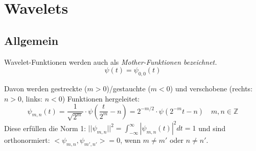 \section{Wavelets}
\subsection{Allgemein }
  Wavelet-Funktionen werden auch als \em Mother-Funktionen \em bezeichnet.
  \[
    \psi(t) = \psi_{0,0}(t)
  \]
 
  Davon werden gestreckte ($m>0$)/gestauchte ($m<0$) und verschobene (rechts: $n > 0$, links: $n < 0$) Funktionen hergeleitet:
  \[  
    \psi_{m,n}(t)=\frac{1}{\sqrt{2^m}} \cdot \psi\left(\frac{t}{2^m} - n\right) = 2^{-m/2} \cdot \psi(2^{-m}t-n) \quad m,n \in \mathbb{Z}
  \]
  Diese erfüllen die Norm 1: $|| \psi_{m,n} ||^2 = \int_{-\infty}^{\infty} |\psi_{m,n}(t)|^2 dt = 1$ und sind orthonormiert: $<\psi_{m,n}, \psi_{m',n'}> = 0$, wenn $m \neq m'$ oder $n \neq n'$.

